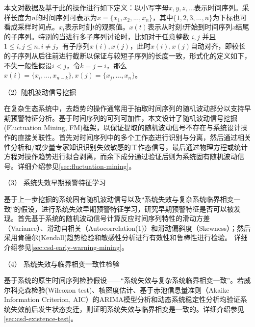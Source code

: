 本文对数据及基于此的操作进行如下定义：以小写字母$x,y,z,...$表示时间序列。采样长度为\emph{n}的时间序列可表示为$x=\{x_{1}, x_{2}, ..., x_{n}\}$，其中$\{1,2,3,...,n\}$为下标也可看成采样时间点。$x_{t}$表示时刻$t$的观察值。$x(t)$表示从时刻\emph{t}开始到时间序列\emph{x}结尾的子序列。特别的当进行多子序列讨论时，比如对于任意整数 $i,j$ 并且$1 \leqslant  i,j \leqslant n, i \neq j$，有子序列$x(i),x(j)$，此时$x(i),x(j)$自动对齐，即较长的子序列从后往前进行截断以保证与较短子序列的长度一致，形式化的定义如下，不失一般性假设$i<j$，令$k=j-i$，那么$x(i)=\{x_{i}, ..., x_{n-k}\}, x(j) = \{x_{j}, ..., x_{n}\}$。

（2）随机波动信号挖掘

在复杂生态系统中，去趋势\cite{wang2012flickering}的操作通常用于抽取时间序列的随机波动部分以支持早期预警特征分析\cite{cotilla2012predicting}。基于时间序列的可列可加性，本文设计了随机波动信号挖掘(Fluctuation Mining, FM)框架，以保证提取的随机波动信号不存在与系统设计操作的直接关联性。首先对时间序列中的多个工作态进行识别与分离，然后通过相关性分析和/或少量专家知识识别失效敏感的工作态信号，最后通过物理方程或统计方程对操作趋势进行拟合剥离，而余下成分通过验证后则为系统固有随机波动信号。详细介绍参见\ref{sec:fluctuation-mining}。

（3） 系统失效早期预警特征学习

基于上一步挖掘的系统固有随机波动信号以及“系统失效与复杂系统临界相变一致”的假设，进行系统失效早期预警特征学习，研究早期预警特征是否可以被发现。首先基于系统的随机波动信号计算反应时间序列特性的滑动方差（Variance）、滑动自相关（Autocorrelation(1)）和滑动偏斜度（Skewness）；然后采用肯德尔(Kendall)趋势检验和敏感性分析进行有效性和鲁棒性进行检验。
详细介绍参见\ref{sec:csd-early-warning-mining}。

（4） 系统失效与临界相变一致性检验

基于系统的原生时间序列检验假设——“系统失效与复杂系统临界相变一致”。若威尔科克森检验(Wilcoxon test)\cite{bisgaard2011time}、核密度估计\cite{bisgaard2011time}、基于赤池信息量准则（Akaike Information Criterion, AIC）的ARIMA模型分析和动态系统稳定性分析\cite{brunton2016discovering}均验证系统失效前后发生状态变迁，则证明系统失效与临界相变是一致的。详细介绍参见\ref{sec:csd-existence-test}。

